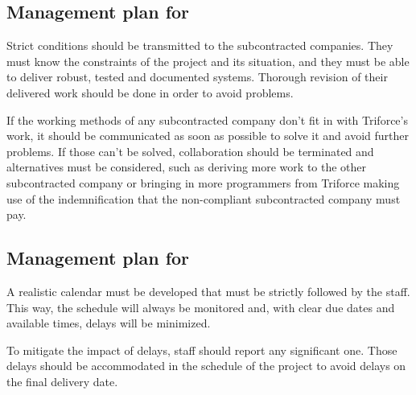 \subsection{Management plan for }

Strict conditions should be transmitted to the subcontracted companies. They must know the constraints of the project and its situation, and they must be able to deliver robust, tested and documented systems. Thorough revision of their delivered work should be done in order to avoid problems.

If the working methods of any subcontracted company don't fit in with Triforce's work, it should be communicated as soon as possible to solve it and avoid further problems. If those can't be solved, collaboration should be terminated and alternatives must be considered, such as deriving more work to the other subcontracted company or bringing in more programmers from Triforce making use of the indemnification that the non-compliant subcontracted company must pay.

\subsection{Management plan for }

A realistic calendar must be developed that must be strictly followed by the staff. This way, the schedule will always be monitored and, with clear due dates and available times, delays will be minimized.

To mitigate the impact of delays, staff should report any significant one. Those delays should be accommodated in the schedule of the project to avoid delays on the final delivery date.
